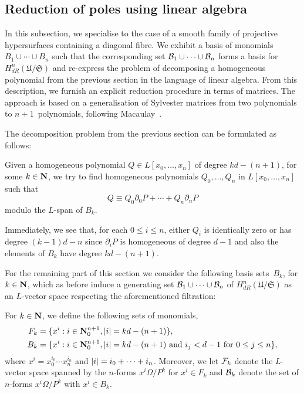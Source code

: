 \subsection{Reduction of poles using linear algebra}
\label{sec:01-04-linalg}

In this subsection, we specialise to the case of a smooth family of 
projective hypersurfaces containing a diagonal fibre.  We exhibit a basis 
of monomials $B_1 \cup \dotsb \cup B_n$ such that the corresponding set 
$\mathcal{B}_1 \cup \dotsb \cup \mathcal{B}_n$ forms a basis for 
$H_{dR}^n(\mathfrak{U}/\mathfrak{S})$ and re-express the problem of 
decomposing a homogeneous polynomial from the previous section in the 
language of linear algebra.  From this description, we furnish an 
explicit reduction procedure in terms of matrices.  The approach is 
based on a generalisation of Sylvester matrices from two polynomials to 
$n+1$~polynomials, following Macaulay~\citep{Macaulay1994}.

The decomposition problem from the previous section can be formulated as 
follows:

\begin{prob} \label{prob:Decomposition1}
Given a homogeneous polynomial $Q \in L[x_0, \dotsc, x_n]$ of degree 
$k d - (n + 1)$, for some $k \in \mathbf{N}$, we try to find homogeneous polynomials 
$Q_0, \dotsc, Q_n$ in $L[x_0, \dotsc, x_n]$ such that 
\begin{equation} \label{eq:PDecomposition1}
Q \equiv Q_0 \partial_0 P + \dotsb + Q_n \partial_n P
\end{equation}
modulo the $L$-span of $B_k$.
\end{prob}

\begin{rem}
Immediately, we see that, for each $0 \leq i \leq n$, either $Q_i$ is 
identically zero or has degree $(k - 1) d - n$ since $\partial_i P$ is 
homogeneous of degree $d - 1$ and also the elements of $B_k$ have degree 
$kd - (n+1)$.
\end{rem}

For the remaining part of this section we consider the following basis 
sets~$B_k$, for $k \in \mathbf{N}$, which as before induce a generating set 
$\mathcal{B}_1 \cup \dotsb \cup \mathcal{B}_n$ of $H_{dR}^n(\mathfrak{U}/\mathfrak{S})$ 
as an $L$-vector space respecting the aforementioned filtration:

\begin{defn} \label{defn:01-04-basis}
For $k \in \mathbf{N}$, we define the following sets of monomials, 
\begin{align*}
F_k & = \{ x^i : i \in \mathbf{N}_{0}^{n+1}, \lvert i\rvert = k d - (n+1) \}, \\
B_k & = \{ x^i : i \in \mathbf{N}_{0}^{n+1}, \lvert i\rvert = k d - (n+1) \text{ and $i_j < d-1$ for $0 \leq j \leq n$}\},
\end{align*}
where $x^i = x_0^{i_0} \dotsm x_n^{i_n}$ and 
$\lvert i\rvert = i_0 + \dotsb + i_n$.  Moreover, we let 
$\mathcal{F}_k$ denote the $L$-vector space spanned by the $n$-forms 
$x^i \Omega / P^k$ for $x^i \in F_k$ and $\mathcal{B}_k$ denote the 
set of $n$-forms $x^i \Omega / P^k$ with $x^i \in B_k$.
\end{defn}

